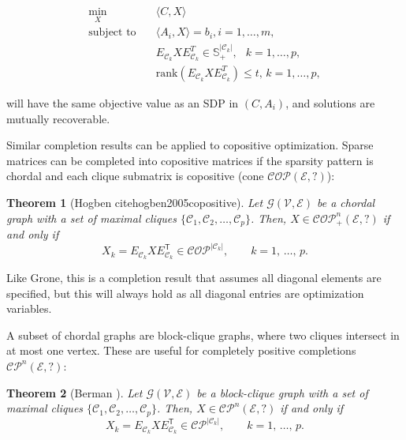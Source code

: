 \documentclass{article}
\newcommand{\tr}{{\mathsf T}}
\newcommand{\es}{\mathcal{E}}
\newcommand{\cp}{\mathcal{C}\mathcal{P}}
\newcommand{\cop}{\mathcal{C}\mathcal{O}\mathcal{P}}
\newtheorem{theorem}{Theorem}
\begin{document}
    \begin{equation} \label{Eq:PrimalSDPdecomposition}
    \begin{aligned}
    \min_{X} \quad & \langle C,X \rangle \\
    \text{subject to} \quad & \langle A_i,X \rangle = b_i, i = 1, \ldots, m,\\
    & E_{\mathcal{C}_k} X E_{\mathcal{C}_k}^T\in \mathbb{S}^{\vert \mathcal{C}_k \vert}_+, \;\;\, k = 1, \ldots, p, \\
    & \text{rank}(E_{\mathcal{C}_k} X E_{\mathcal{C}_k}^T) \leq t, \, k = 1, \ldots, p,
    \end{aligned}
\end{equation}

will have the same objective value as an SDP in $(C, A_i)$, and  solutions are mutually recoverable.

Similar completion results can be applied to copositive optimization. Sparse matrices can be completed into copositive matrices if the sparsity pattern is chordal and each clique submatrix is copositive (cone $\cop(\es, ?)$):

 \begin{theorem} [Hogben cite{hogben2005copositive}] \label{T:Hog enTheorem}
     Let $\mathcal{G}(\mathcal{V},\mathcal{E})$ be a chordal graph with a set of maximal cliques $\{\mathcal{C}_1,\mathcal{C}_2, \ldots, \mathcal{C}_p\}$. Then, $X\in\cop^n_+(\mathcal{E},?)$ if and only if
     $$ X_k = E_{\mathcal{C}_k} X E_{\mathcal{C}_k}^\tr \in \cop^{\vert \mathcal{C}_k \vert},
    \qquad k=1,\,\ldots,\,p.$$
    \end{theorem}

Like Grone, this is a completion result that assumes all diagonal elements are specified, but this will always hold as all diagonal entries are optimization variables. 

A subset of chordal graphs are block-clique graphs, where two cliques intersect in at most one vertex. These are useful for completely positive completions $\cp^n(\es,  ?)$:

 \begin{theorem} [Berman \cite{berman2003completely}] \label{T:Hog enTheorem}
     Let $\mathcal{G}(\mathcal{V},\mathcal{E})$ be a block-clique graph with a set of maximal cliques $\{\mathcal{C}_1,\mathcal{C}_2, \ldots, \mathcal{C}_p\}$. Then, $X\in\cp^n(\mathcal{E},?)$ if and only if
     $$ X_k = E_{\mathcal{C}_k} X E_{\mathcal{C}_k}^\tr \in \cp^{\vert \mathcal{C}_k \vert},
    \qquad k=1,\,\ldots,\,p.$$
    \end{theorem}
    
\end{document}
